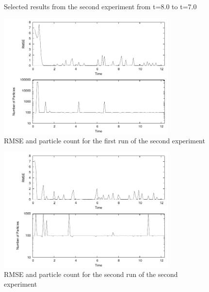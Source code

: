 \documentclass[english]{article}
\begin{document}
\begin{figure}
  \caption{Selected results from the second experiment from t=8.0 to t=7.0}
  \label{fig:exp2diags4}
\end{figure}

\begin{figure}[htp]
\centering
 \includegraphics[width=0.8\textwidth]{images/experiment2/res3/rmse_particles}
\caption{RMSE and particle count for the first run of the second experiment}
\label{fig:ex2res3}
\end{figure}
\begin{figure}[htp]
\centering
 \includegraphics[width=0.8\textwidth]{images/experiment2/res4_rmse_particles}
\caption{RMSE and particle count for the second run of the second experiment}
\label{fig:ex2res4}
\end{figure}
\end{document}
